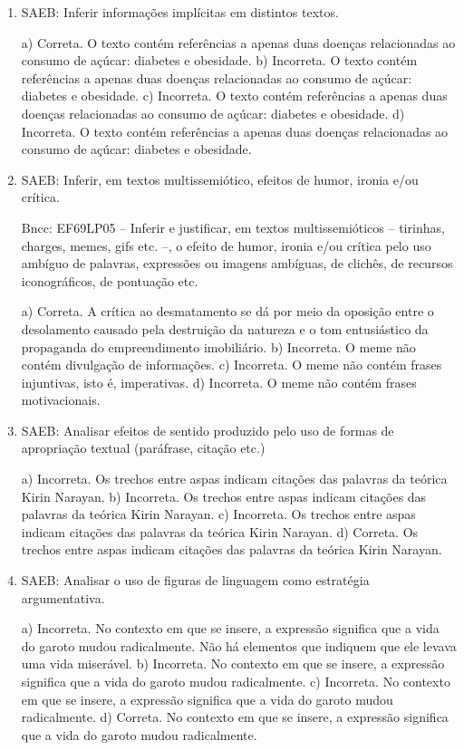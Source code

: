 \begin{enumerate}
	\item
SAEB: Inferir informações implícitas em distintos textos.

a) Correta. O texto contém referências a apenas duas doenças relacionadas 
ao consumo de açúcar: diabetes e obesidade.
b) Incorreta. O texto contém referências a apenas duas doenças relacionadas 
ao consumo de açúcar: diabetes e obesidade.
c) Incorreta. O texto contém referências a apenas duas doenças relacionadas 
ao consumo de açúcar: diabetes e obesidade.
d) Incorreta. O texto contém referências a apenas duas doenças relacionadas 
ao consumo de açúcar: diabetes e obesidade.

	\item
SAEB: Inferir, em textos multissemiótico, efeitos de humor, ironia e/ou
crítica.

Bncc: EF69LP05 -- Inferir e justificar, em textos multissemióticos -- tirinhas, charges,
memes, gifs etc. --, o efeito de humor, ironia e/ou crítica pelo uso
ambíguo de palavras, expressões ou imagens ambíguas, de clichês, de
recursos iconográficos, de pontuação etc.

a) Correta. A crítica ao desmatamento se dá por meio da oposição entre o
desolamento causado pela destruição da natureza e o tom entusiástico da
propaganda do empreendimento imobiliário. 
b) Incorreta. O meme não contém divulgação de informações. 
c) Incorreta. O meme não contém frases injuntivas, isto é, imperativas.
d) Incorreta. O meme não contém frases motivacionais.

	\item
SAEB: Analisar efeitos de sentido produzido pelo uso de formas de
apropriação textual (paráfrase, citação etc.)

a) Incorreta. Os trechos entre aspas indicam citações das palavras da teórica Kirin Narayan.
b) Incorreta. Os trechos entre aspas indicam citações das palavras da teórica Kirin Narayan.
c) Incorreta. Os trechos entre aspas indicam citações das palavras da teórica Kirin Narayan.
d) Correta. Os trechos entre aspas indicam citações das palavras da teórica Kirin Narayan.

	\item
SAEB: Analisar o uso de figuras de linguagem como estratégia
argumentativa.

a) Incorreta. No contexto em que se insere, a expressão significa que a vida 
do garoto mudou radicalmente. Não há elementos que indiquem que ele levava
uma vida miserável. 
b) Incorreta. No contexto em que se insere, a expressão significa que a vida 
do garoto mudou radicalmente.
c) Incorreta. No contexto em que se insere, a expressão significa que a vida 
do garoto mudou radicalmente.
d) Correta. No contexto em que se insere, a expressão significa que a vida 
do garoto mudou radicalmente.


\end{enumerate}
